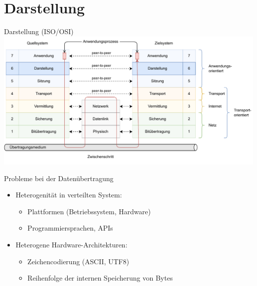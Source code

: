 \section{Darstellung}

\begin{defi}{Darstellung (ISO/OSI)}
    \includegraphics[width=\textwidth]{includes/figures/defi_iso_osi_presentation.pdf}
\end{defi}

\begin{bonus}{Probleme bei der Datenübertragung}
    \begin{itemize}
        \item Heterogenität in verteilten System:

              \begin{itemize}
                  \item Plattformen (Betriebssystem, Hardware)
                  \item Programmiersprachen, APIs
              \end{itemize}
        \item Heterogene Hardware-Architekturen:

              \begin{itemize}
                  \item Zeichencodierung (ASCII, UTF8)
                  \item Reihenfolge der internen Speicherung von Bytes
              \end{itemize}
    \end{itemize}
\end{bonus}

